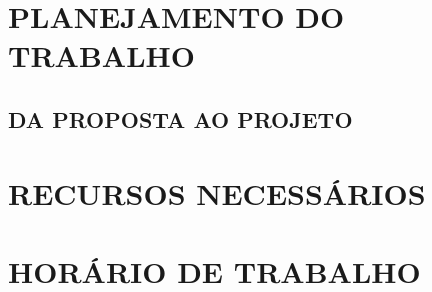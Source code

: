 \section{PLANEJAMENTO DO TRABALHO}
\label{sec:planejamento}


\subsection{DA PROPOSTA AO PROJETO}

\section{RECURSOS NECESSÁRIOS}
\label{sec:recursos}

\section{HORÁRIO DE TRABALHO}
\label{sec:horário}

